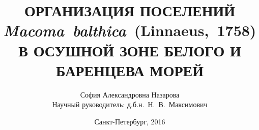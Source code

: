 \documentclass[aspectratio=169, xcolor=table]{beamer}
\begin{document}
\title[]{ОРГАНИЗАЦИЯ ПОСЕЛЕНИЙ\\ {\it Macoma~balthica}~(Linnaeus,~1758)\\ В ОСУШНОЙ ЗОНЕ БЕЛОГО И БАРЕНЦЕВА МОРЕЙ}
\author[]{София Александровна Назарова \\ \medskip
	\footnotesize{Научный руководитель: д.б.н.~Н.~В.~Максимович}}
\date{Санкт-Петербург, 2016} 

{
\frame{\titlepage} 
}





\end{document}
